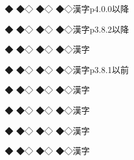 \def\◆{◇}\def\漢{◇}

{{\the\ptexlineendmode ◆}
◆\◆
◆\漢}
◆\漢 漢字\quad p4.0.0以降

{{\the\ptexlineendmode ◆}
◆\◆
◆\漢}
◆\漢 漢字\quad p3.8.2以降

{{\the\ptexlineendmode ◆}
◆\◆
◆\漢}
◆\漢 漢字

{{\the\ptexlineendmode ◆}
◆\◆
◆\漢}
◆\漢 漢字\quad p3.8.1以前

{{\the\ptexlineendmode ◆}
◆\◆
◆\漢}
◆\漢 漢字

{{\the\ptexlineendmode ◆}
◆\◆
◆\漢}
◆\漢 漢字

{{\the\ptexlineendmode ◆}
◆\◆
◆\漢}
◆\漢 漢字

{{\the\ptexlineendmode ◆}
◆\◆
◆\漢}
◆\漢 漢字

\bye
